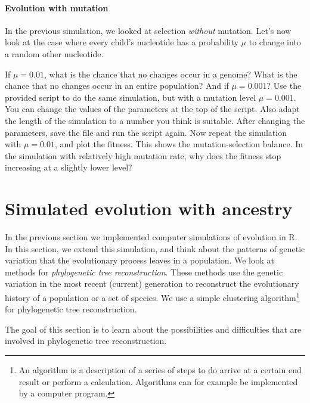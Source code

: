 \documentclass[a4paper, 9pt]{article}
\begin{document}
\paragraph{Evolution with mutation}

In the previous simulation, we looked at selection \textit{without}
mutation. Let's now look at the case where every child's nucleotide has
a probability $\mu$ to change into a random other nucleotide.

\begin{exercise}
    \askstar If $\mu=0.01$, what is the chance that no changes occur in a genome? What is the chance that no changes occur in an entire population? And if $\mu=0.001$?
    \action Use the provided  script to do the same simulation, but with a mutation level $\mu=0.001$. You can change the values of the parameters at the top of the script. Also adapt the length of the simulation to a number you think is suitable. After changing the parameters, save the file and run the script again. 
    \action Now repeat the simulation with $\mu=0.01$, and plot the fitness. This shows the mutation-selection balance.
    \askstar In the simulation with relatively high mutation rate, why does the fitness stop increasing at a slightly lower level?
\end{exercise}

\section{Simulated evolution with ancestry}\label{simulated-evolution-continued}
In the previous section we implemented computer simulations of evolution in R. In this section, we extend this simulation, and think about the patterns of genetic variation that the evolutionary process leaves in a population. We look at methods for \emph{phylogenetic tree reconstruction}. These methods use the genetic variation in the most recent (current) generation to reconstruct the evolutionary history of a population or a set of species. We use a simple clustering algorithm\footnote{An algorithm is a description of a series of steps to do arrive at a certain end result or perform a calculation. Algorithms can for example be implemented by a computer program.} for phylogenetic tree reconstruction. 

\begin{goals}
The goal of this section is to learn about the possibilities and difficulties that are involved in phylogenetic tree reconstruction.
\end{goals}
\end{document}
